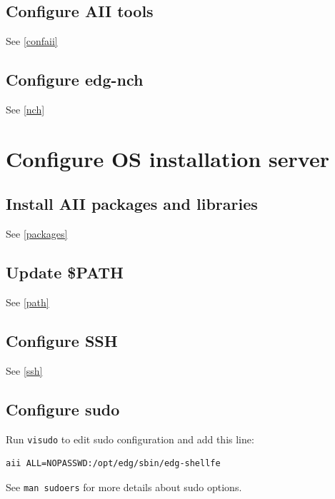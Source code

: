 \documentclass{datagridreport}
\begin{document}
\subsection{Configure AII tools} %
See \ref{confaii}

\subsection{Configure edg-nch} %
See \ref{nch}


\section{Configure OS installation server}
\subsection{Install AII packages and libraries} %
See \ref{packages}

\subsection{Update \$PATH} %
See \ref{path}

\subsection{Configure SSH} %
See \ref{ssh}

\subsection{Configure sudo} \label{sudo2} %
Run \texttt{visudo} to edit sudo configuration and add this line:
\begin{verbatim}
aii ALL=NOPASSWD:/opt/edg/sbin/edg-shellfe
\end{verbatim}
See \texttt{man sudoers} for more details about sudo options.
\end{document}
